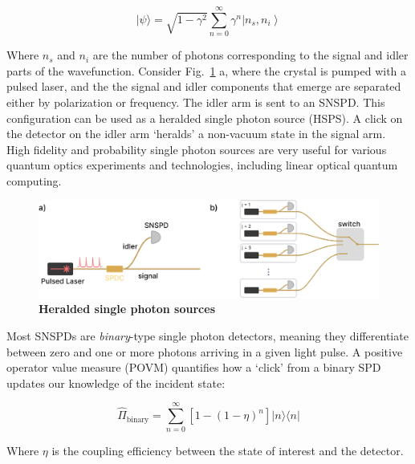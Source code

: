 \documentclass[11pt]{caltech_thesis} %
\begin{document}
$$|\psi\rangle= \sqrt{1 - \gamma^2} \sum_{n=0}^{\infty} \gamma^{n}\left|n_{s}, n_{i}\right\rangle $$

Where $n_s$ and $n_i$ are the number of photons corresponding to the
signal and idler parts of the wavefunction. Consider Fig.~\ref{fig:hsps}
a, where the crystal is pumped with a pulsed laser, and the the signal
and idler components that emerge are separated either by polarization or
frequency. The idler arm is sent to an SNSPD. This configuration can be
used as a heralded single photon source (HSPS). A click on the detector
on the idler arm `heralds' a non-vacuum state in the signal arm. High
fidelity and probability single photon sources are very useful for
various quantum optics experiments and technologies, including linear
optical quantum computing.

\hypertarget{fig:hsps}{%
\begin{figure}
\centering
\includegraphics{chapter_05/figs_05/hsps_light.pdf}
\caption[{Heralded single photon source designs}]{\textbf{Heralded
single photon sources}}
\label{fig:hsps}
\end{figure}
}

Most SNSPDs are \emph{binary}-type single photon detectors, meaning they
differentiate between zero and one or more photons arriving in a given
light pulse. A positive operator value measure (POVM) quantifies how a
`click' from a binary SPD updates our knowledge of the incident state:

$$\hat{\Pi}_{\text {binary}} = \sum_{n=0}^{\infty}\left[1-(1-\eta)^{n}\right]|n\rangle\langle n|$$

Where $\eta$ is the coupling efficiency between the state of interest
and the detector.
\end{document}

